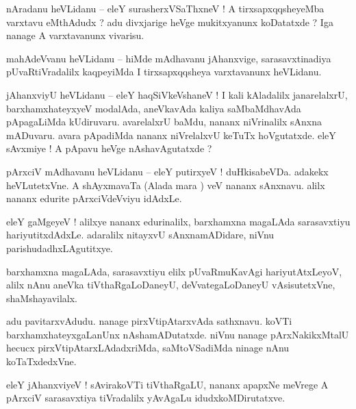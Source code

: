 \documentclass{article}
\begin{document}
\begin{mn}%
nAradanu heVLidanu -- eleY surasherxVSaThxneV ! A tirxsapxqqsheyeMba varxtavu eMthAdudx ? adu 
divxjarige heVge mukitxyanunx koDatatxde ? Iga nanage A varxtavanunx vivarisu.
\end{mn}

\begin{mn}%
mahAdeVvanu heVLidanu -- hiMde mAdhavanu jAhanxvige, sarasavxtinadiya pUvaRtiVradalilx kaqpeyiMda I 
tirxsapxqqsheya varxtavanunx heVLidanu.
\end{mn}

\begin{mn}%
jAhanxviyU heVLidanu -- eleY haqSiVkeVshaneV ! I kali kAladalilx janarelalxrU, barxhamxhateyxyeV 
modalAda, aneVkavAda kaliya saMbaMdhavAda pApagaLiMda kUdiruvaru. avarelalxrU baMdu, nananx 
niVrinalilx sAnxna mADuvaru. avara pApadiMda nananx niVrelalxvU keTuTx hoVgutatxde. eleY sAvxmiye ! 
A pApavu heVge nAshavAgutatxde ?
\end{mn}

\begin{mn}%
pArxciV mAdhavanu heVLidanu -- eleY putirxyeV ! duHkisabeVDa. adakekx heVLutetxVne. A shAyxmavaTa 
(Alada mara ) veV nananx sAnxnavu. alilx  nananx edurite pArxciVdeVviyu idAdxLe.
\end{mn}

\begin{mn}%
eleY gaMgeyeV ! alilxye nananx edurinalilx, barxhamxna magaLAda sarasavxtiyu hariyutitxdAdxLe. 
adaralilx nitayxvU sAnxnamADidare, niVnu parishudadhxLAgutitxye.
\end{mn}

\begin{mn}%
barxhamxna magaLAda, sarasavxtiyu elilx pUvaRmuKavAgi hariyutAtxLeyoV, alilx nAnu aneVka 
tiVthaRgaLoDaneyU, deVvategaLoDaneyU vAsisutetxVne, shaMshayavilalx.
\end{mn}

\begin{mn}%
adu pavitarxvAdudu. nanage pirxVtipAtarxvAda sathxnavu. koVTi barxhamxhateyxgaLanUnx 
nAshamADutatxde. niVnu nanage pArxNakikxMtalU hecucx pirxVtipAtarxLAdadxriMda, saMtoVSadiMda 
ninage nAnu koTaTxdedxVne. 
\end{mn}

\begin{mn}%
eleY jAhanxviyeV ! sAvirakoVTi tiVthaRgaLU, nananx apapxNe meVrege A pArxciV sarasavxtiya 
tiVradalilx yAvAgaLu idudxkoMDirutatxve.
\end{mn}
\end{document}
